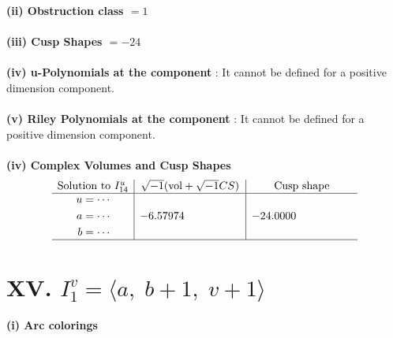 \documentclass[1p]{elsarticle_modified}
\theoremstyle{definition}
\newcommand{\I}{\sqrt{-1}}
\begin{document}
\flushleft \textbf{(ii) Obstruction class $= 1$}\\~\\
\flushleft \textbf{(iii) Cusp Shapes $= -24$}\\~\\
\flushleft \textbf{(iv) u-Polynomials at the component} : It cannot be defined for a positive dimension component.\\~\\
\flushleft \textbf{(v) Riley Polynomials at the component} : It cannot be defined for a positive dimension component.\\~\\
\newpage\flushleft \textbf{(iv) Complex Volumes and Cusp Shapes}
$$\begin{array}{c|c|c} 
\text{Solution to }I^u_{14}& \I (\text{vol} + \sqrt{-1}CS) & \text{Cusp shape}\\
 \hline 
\begin{aligned}
u &= \cdots \\
a &= \cdots \\
b &= \cdots\end{aligned}
 & -6.57974\phantom{ +0.000000I} & -24.0000\phantom{ +0.000000I}\\
 \hline 
 \end{array}
$$\newpage\renewcommand{\arraystretch}{1}
\centering \section*{XV. $I^v_{1}= \langle a,\;b+1,\;v+1 \rangle$}
\flushleft \textbf{(i) Arc colorings}\\
\end{document}

